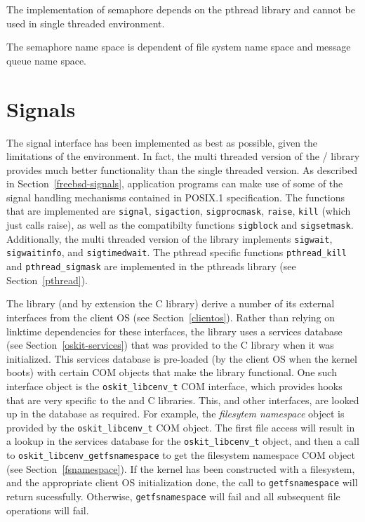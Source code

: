 \begin{apidesc}
  The implementation of \posix{} semaphore depends on
  the pthread library and cannot be used in single threaded environment.

  The semaphore name space is dependent of file system name
  space and message queue name space.
\end{apidesc}

\section{\textnormal{\posix{}} Signals}
\label{posix-signals}

The \posix{} signal interface has been implemented as best as possible,
given the limitations of the \oskit{} environment. In fact, the multi
threaded version of the \posix/\freebsd{} library provides much better
functionality than the single threaded version. As described in
Section~\ref{freebsd-signals}, application programs can make use of some of the
signal handling mechanisms contained in POSIX.1 specification. The
functions that are implemented are \texttt{signal}, \texttt{sigaction},
\texttt{sigprocmask}, \texttt{raise}, \texttt{kill} (which just calls
raise), as well as the compatibilty functions \texttt{sigblock} and
\texttt{sigsetmask}. Additionally, the multi threaded version of the
library implements \texttt{sigwait}, \texttt{sigwaitinfo}, and
\texttt{sigtimedwait}. The pthread specific functions \texttt{pthread_kill}
and \texttt{pthread_sigmask} are implemented in the pthreads library (see
Section~\ref{pthread}).


The \posix{} library (and by extension the C library) derive a number of
its external interfaces from the client OS (see Section~\ref{clientos}).
Rather than relying on linktime dependencies for these interfaces, the
\posix{} library uses a services database (see Section~\ref{oskit-services})
that was provided to the C library when it was
initialized. This services database is pre-loaded (by the client OS when
the kernel boots) with certain COM objects that make the \posix{} library
functional. One such interface object is the \texttt{oskit_libcenv_t} COM
interface, which provides hooks that are very specific to the \posix{} and C
libraries. This, and other interfaces, are looked up in the database as
required. For example, the \emph{filesytem namespace} object is
provided by the \texttt{oskit_libcenv_t} COM object. The first file access
will result in a lookup in the services database for the
\texttt{oskit_libcenv_t} object, and then a call to
\texttt{oskit_libcenv_getfsnamespace} to get the filesystem namespace
COM object (see Section~\ref{fsnamespace}). If the kernel has been
constructed with a filesystem, and the appropriate
client OS initialization done, the call to \texttt{getfsnamespace} will
return sucessfully. Otherwise, \texttt{getfsnamespace} will fail and all
subsequent file operations will fail.

